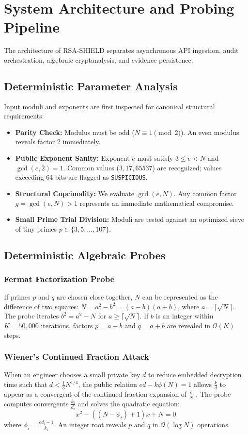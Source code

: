 \documentclass[sigconf,nonacm]{acmart}
\begin{document}
\section{System Architecture and Probing Pipeline}
The architecture of RSA-SHIELD separates asynchronous API ingestion, audit orchestration, algebraic cryptanalysis, and evidence persistence.

\subsection{Deterministic Parameter Analysis}
Input moduli and exponents are first inspected for canonical structural requirements:
\begin{itemize}
    \item \textbf{Parity Check:} Modulus must be odd ($N \equiv 1 \pmod 2$). An even modulus reveals factor 2 immediately.
    \item \textbf{Public Exponent Sanity:} Exponent $e$ must satisfy $3 \le e < N$ and $\gcd(e, 2) = 1$. Common values ($3, 17, 65537$) are recognized; values exceeding 64 bits are flagged as \texttt{SUSPICIOUS}.
    \item \textbf{Structural Coprimality:} We evaluate $\gcd(e, N)$. Any common factor $g = \gcd(e, N) > 1$ represents an immediate mathematical compromise.
    \item \textbf{Small Prime Trial Division:} Moduli are tested against an optimized sieve of tiny primes $p \in \{3, 5, \dots, 107\}$.
\end{itemize}

\subsection{Deterministic Algebraic Probes}
\subsubsection{Fermat Factorization Probe}
If primes $p$ and $q$ are chosen close together, $N$ can be represented as the difference of two squares: $N = a^2 - b^2 = (a - b)(a + b)$, where $a = \lceil\sqrt{N}\rceil$. The probe iterates $b^2 = a^2 - N$ for $a \ge \lceil\sqrt{N}\rceil$. If $b$ is an integer within $K = 50,000$ iterations, factors $p = a - b$ and $q = a + b$ are revealed in $\mathcal{O}(K)$ steps.

\subsubsection{Wiener's Continued Fraction Attack}
When an engineer chooses a small private key $d$ to reduce embedded decryption time such that $d < \frac{1}{3} N^{1/4}$, the public relation $e d - k \phi(N) = 1$ allows $\frac{k}{d}$ to appear as a convergent of the continued fraction expansion of $\frac{e}{N}$ \cite{wiener1990cryptanalysis}. The probe computes convergents $\frac{k_i}{d_i}$ and solves the quadratic equation:
\begin{equation}
x^2 - ((N - \phi_i) + 1)x + N = 0
\end{equation}
where $\phi_i = \frac{e d_i - 1}{k_i}$. An integer root reveals $p$ and $q$ in $\mathcal{O}(\log N)$ operations.
\end{document}
